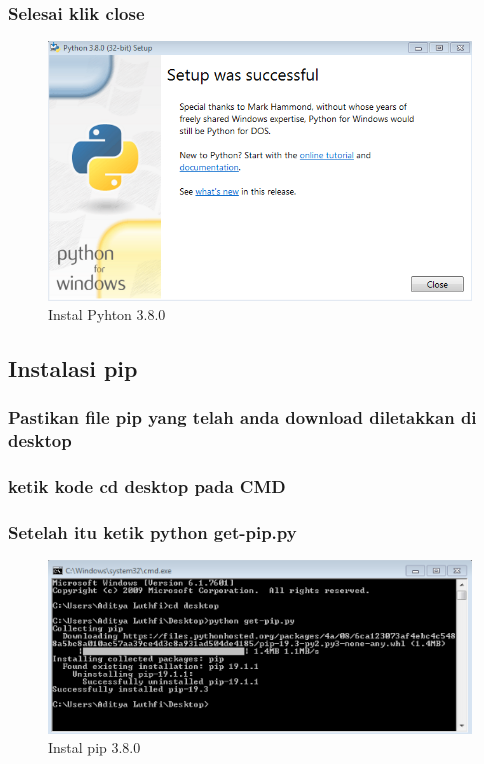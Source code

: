 \documentclass[12pt, times new roman, a4paper]{article}
\begin{document}
\subsubsection{Selesai klik close}
	\begin{figure}[h]
		\centering
		\includegraphics[scale=0.55]{Gambar/p3}
		\caption{Instal Pyhton 3.8.0}
	\end{figure}

\subsection{Instalasi pip}

\subsubsection{Pastikan file pip yang telah anda download diletakkan di desktop}
\subsubsection{ketik kode cd desktop pada CMD}
\subsubsection{Setelah itu ketik python get-pip.py}
	
	\begin{figure}[h]
		\centering
		\includegraphics[scale=0.6]{Gambar/y}
		\caption{Instal pip 3.8.0}
	\end{figure}
	
\end{document}
